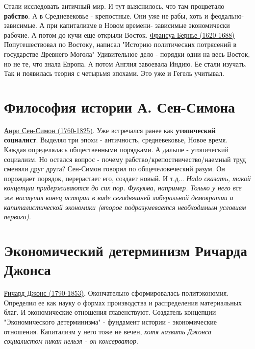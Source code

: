 Стали исследовать античный мир. И тут выяснилось, что там процветало \textbf{рабство}. А в Средневековье - крепостные. Они уже не рабы, хоть и феодально-зависимые. А при капитализме в Новом времени- зависимые экономически рабочие. А потом до кучи еще открыли Восток. 
\underline{Франсуа Бернье (1620-1688)} Попутешествовал по Востоку, написал "Историю политических потрясений в государстве Древнего Могола" Удивительное дело - порядки одни на весь Восток, но не те, что знала Европа. А потом Англия завоевала Индию. Ее стали изучать. Так и появилась теория с четырьмя эпохами. Это уже и Гегель учитывал.

\section{Философия истории А. Сен-Симона}
\underline{Анри Сен-Симон (1760-1825)}. Уже встречался ранее как \textbf{утопический социалист}. Выделял три эпохи - античность, средневековье, Новое время. Каждая определялась общественными порядками. А дальше - утопический социализм. Но остался вопрос - почему рабство/крепостничество/наемный труд сменяли друг друга? Сен-Симон говорил по общечеловеческий разум. Он порождает порядок, перерастает его, создает новый. И т.д... \textit{Надо сказать, такой концепции придерживаются до сих пор. Фукуяма, например. Только у него все же наступил конец истории в виде сегодняшней либеральной демократии и капиталистической экономики (второе подразумевается необходимым условием первого)}.

\section{Экономический детерминизм Ричарда Джонса}
\underline{Ричард Джонс (1790-1853)}. Окончательно сформировалась политэкономия. Определил ее как науку о формах производства и распределения материальных благ. И экономические отношения главенствуют. Создатель концепции "Экономического детерминизма" - фундамент истории - экономические отношения. Капитализм у  него тоже не вечен, \textit{хотя назвать Джонса социалистом никак нельзя - он консерватор}. 


